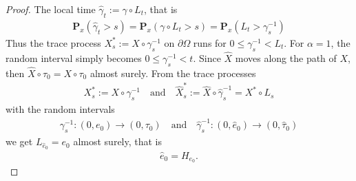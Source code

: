 \documentclass[11pt,a4paper]{article}
\begin{document}
\begin{proof}
The local time $\hat{\gamma}_t := \gamma \circ L_t$, that is
\begin{align*}
\mathbf{P}_x(\hat{\gamma}_t > s) = \mathbf{P}_x (\gamma \circ L_t >s) = \mathbf{P}_x(L_t > \gamma^{-1}_s) 
\end{align*}
Thus the trace process $X^*_s := X \circ \gamma^{-1}_s$ on $\partial \Omega$ runs for $0 \leq \gamma^{-1}_s < L_t$. For $\alpha=1$, the random interval simply becomes $0 \leq \gamma^{-1}_s < t$. Since $\hat{X}$ moves along the path of $X$, then $\hat{X}\circ \hat{\tau}_0 = X \circ \tau_0$ almost surely. From the trace processes 
\begin{align*}
X^*_s := X \circ \gamma^{-1}_s \quad \textrm{and} \quad \hat{X}^*_s := \hat{X} \circ \hat{\gamma}^{-1}_s = X^* \circ L_s
\end{align*}
with the random intervals 
\begin{align*}
\gamma^{-1}_s : (0, e_0) \to (0,\tau_0) \quad \textrm{and} \quad \hat{\gamma}^{-1}_s : (0, \hat{e}_0) \to (0, \hat{\tau}_0)
\end{align*}
we get $L_{\hat{e}_0} = e_0$ almost surely, that is
\begin{align*}
\hat{e}_0 = H_{e_0}.
\end{align*} 



\end{proof}
\end{document}
